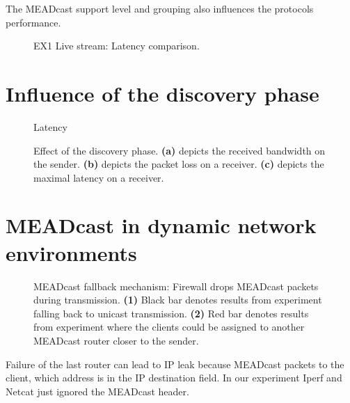 The MEADcast support level and grouping also influences the protocols
    performance.
\begin{figure}
    \begin{center}
        
    \end{center}
    \caption[EX1 Live stream: Latency comparison]{
        EX1 Live stream: Latency comparison.
    }
    \label{fig:latency_cmp}
\end{figure}



\section{Influence of the discovery phase} %
\label{sec:Influence of the Discovery phase}
\begin{figure}
    \begin{center}
        
    \end{center}
    \caption[Latency]{Latency}
\end{figure}

\begin{figure}
    \begin{center}
        
    \end{center}
    \caption[Effect of the discovery phase]{
        Effect of the discovery phase.
        \textbf{(a)} depicts the received bandwidth on the sender.
        \textbf{(b)} depicts the packet loss on a receiver.
        \textbf{(c)} depicts the maximal latency on a receiver.
    }
\end{figure}


\section{MEADcast in dynamic network environments} %
\label{sec:MEADcast in dynamic network environments}

\begin{figure}
    \begin{center}
        
    \end{center}
    \caption[MEADcast fallback mechanism]{MEADcast fallback mechanism: Firewall drops MEADcast packets during transmission.
        \textbf{(1)} Black bar denotes results from experiment falling back to unicast transmission.
        \textbf{(2)} Red bar denotes results from experiment where the clients could be assigned to another MEADcast router closer to the sender.
        }
\end{figure}

Failure of the last router can lead to IP leak because MEADcast packets to the client, which address is in the IP destination field.
In our experiment Iperf and Netcat just ignored the MEADcast header.

